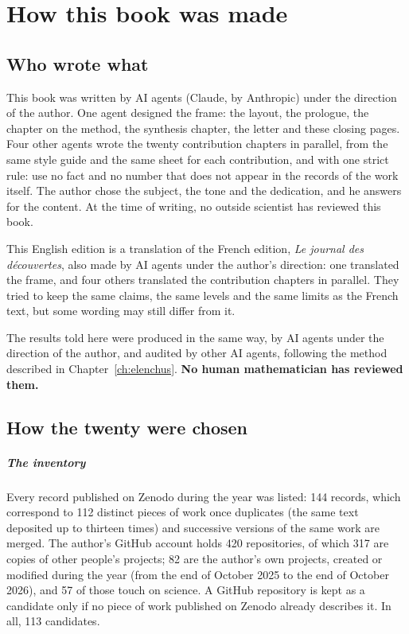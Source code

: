 \chapter{How this book was made}

\section{Who wrote what}

This book was written by AI agents (Claude, by Anthropic) under the direction of the author. One agent designed the
frame: the layout, the prologue, the chapter on the method, the synthesis chapter, the letter and these closing pages.
Four other agents wrote the twenty contribution chapters in parallel, from the same style guide and the same sheet for
each contribution, and with one strict rule: use no fact and no number that does not appear in the records of the
work itself. The author chose the subject, the tone and the dedication, and he answers for the content. At the time
of writing, no outside scientist has reviewed this book.

This English edition is a translation of the French edition, \textit{Le journal des découvertes}, also made by AI
agents under the author's direction: one translated the frame, and four others translated the contribution chapters
in parallel. They tried to keep the same
claims, the same levels and the same limits as the French text, but some wording may still differ from it.

The results told here were produced in the same way, by AI agents under the direction of the author, and audited by
other AI agents, following the method described in Chapter~\ref{ch:elenchus}. \textbf{No human mathematician has
reviewed them.}

\section{How the twenty were chosen}

\paragraph{The inventory} Every record published on Zenodo during the year was listed: 144 records, which correspond to
112 distinct pieces of work once duplicates (the same text deposited up to thirteen times) and successive versions of
the same work are merged. The author's GitHub account holds 420 repositories, of which 317 are copies of other
people's projects; 82 are the author's own projects, created or modified during the year (from the end of October 2025
to the end of October 2026), and 57 of those touch on science. A GitHub repository is kept as a candidate only if no
piece of work published on Zenodo already describes it. In all, 113 candidates.

